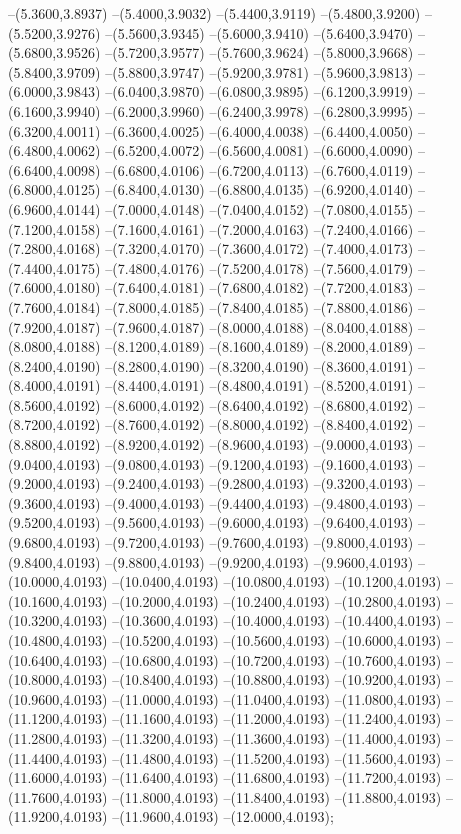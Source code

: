 {	--(5.3600,3.8937)
	--(5.4000,3.9032)
	--(5.4400,3.9119)
	--(5.4800,3.9200)
	--(5.5200,3.9276)
	--(5.5600,3.9345)
	--(5.6000,3.9410)
	--(5.6400,3.9470)
	--(5.6800,3.9526)
	--(5.7200,3.9577)
	--(5.7600,3.9624)
	--(5.8000,3.9668)
	--(5.8400,3.9709)
	--(5.8800,3.9747)
	--(5.9200,3.9781)
	--(5.9600,3.9813)
	--(6.0000,3.9843)
	--(6.0400,3.9870)
	--(6.0800,3.9895)
	--(6.1200,3.9919)
	--(6.1600,3.9940)
	--(6.2000,3.9960)
	--(6.2400,3.9978)
	--(6.2800,3.9995)
	--(6.3200,4.0011)
	--(6.3600,4.0025)
	--(6.4000,4.0038)
	--(6.4400,4.0050)
	--(6.4800,4.0062)
	--(6.5200,4.0072)
	--(6.5600,4.0081)
	--(6.6000,4.0090)
	--(6.6400,4.0098)
	--(6.6800,4.0106)
	--(6.7200,4.0113)
	--(6.7600,4.0119)
	--(6.8000,4.0125)
	--(6.8400,4.0130)
	--(6.8800,4.0135)
	--(6.9200,4.0140)
	--(6.9600,4.0144)
	--(7.0000,4.0148)
	--(7.0400,4.0152)
	--(7.0800,4.0155)
	--(7.1200,4.0158)
	--(7.1600,4.0161)
	--(7.2000,4.0163)
	--(7.2400,4.0166)
	--(7.2800,4.0168)
	--(7.3200,4.0170)
	--(7.3600,4.0172)
	--(7.4000,4.0173)
	--(7.4400,4.0175)
	--(7.4800,4.0176)
	--(7.5200,4.0178)
	--(7.5600,4.0179)
	--(7.6000,4.0180)
	--(7.6400,4.0181)
	--(7.6800,4.0182)
	--(7.7200,4.0183)
	--(7.7600,4.0184)
	--(7.8000,4.0185)
	--(7.8400,4.0185)
	--(7.8800,4.0186)
	--(7.9200,4.0187)
	--(7.9600,4.0187)
	--(8.0000,4.0188)
	--(8.0400,4.0188)
	--(8.0800,4.0188)
	--(8.1200,4.0189)
	--(8.1600,4.0189)
	--(8.2000,4.0189)
	--(8.2400,4.0190)
	--(8.2800,4.0190)
	--(8.3200,4.0190)
	--(8.3600,4.0191)
	--(8.4000,4.0191)
	--(8.4400,4.0191)
	--(8.4800,4.0191)
	--(8.5200,4.0191)
	--(8.5600,4.0192)
	--(8.6000,4.0192)
	--(8.6400,4.0192)
	--(8.6800,4.0192)
	--(8.7200,4.0192)
	--(8.7600,4.0192)
	--(8.8000,4.0192)
	--(8.8400,4.0192)
	--(8.8800,4.0192)
	--(8.9200,4.0192)
	--(8.9600,4.0193)
	--(9.0000,4.0193)
	--(9.0400,4.0193)
	--(9.0800,4.0193)
	--(9.1200,4.0193)
	--(9.1600,4.0193)
	--(9.2000,4.0193)
	--(9.2400,4.0193)
	--(9.2800,4.0193)
	--(9.3200,4.0193)
	--(9.3600,4.0193)
	--(9.4000,4.0193)
	--(9.4400,4.0193)
	--(9.4800,4.0193)
	--(9.5200,4.0193)
	--(9.5600,4.0193)
	--(9.6000,4.0193)
	--(9.6400,4.0193)
	--(9.6800,4.0193)
	--(9.7200,4.0193)
	--(9.7600,4.0193)
	--(9.8000,4.0193)
	--(9.8400,4.0193)
	--(9.8800,4.0193)
	--(9.9200,4.0193)
	--(9.9600,4.0193)
	--(10.0000,4.0193)
	--(10.0400,4.0193)
	--(10.0800,4.0193)
	--(10.1200,4.0193)
	--(10.1600,4.0193)
	--(10.2000,4.0193)
	--(10.2400,4.0193)
	--(10.2800,4.0193)
	--(10.3200,4.0193)
	--(10.3600,4.0193)
	--(10.4000,4.0193)
	--(10.4400,4.0193)
	--(10.4800,4.0193)
	--(10.5200,4.0193)
	--(10.5600,4.0193)
	--(10.6000,4.0193)
	--(10.6400,4.0193)
	--(10.6800,4.0193)
	--(10.7200,4.0193)
	--(10.7600,4.0193)
	--(10.8000,4.0193)
	--(10.8400,4.0193)
	--(10.8800,4.0193)
	--(10.9200,4.0193)
	--(10.9600,4.0193)
	--(11.0000,4.0193)
	--(11.0400,4.0193)
	--(11.0800,4.0193)
	--(11.1200,4.0193)
	--(11.1600,4.0193)
	--(11.2000,4.0193)
	--(11.2400,4.0193)
	--(11.2800,4.0193)
	--(11.3200,4.0193)
	--(11.3600,4.0193)
	--(11.4000,4.0193)
	--(11.4400,4.0193)
	--(11.4800,4.0193)
	--(11.5200,4.0193)
	--(11.5600,4.0193)
	--(11.6000,4.0193)
	--(11.6400,4.0193)
	--(11.6800,4.0193)
	--(11.7200,4.0193)
	--(11.7600,4.0193)
	--(11.8000,4.0193)
	--(11.8400,4.0193)
	--(11.8800,4.0193)
	--(11.9200,4.0193)
	--(11.9600,4.0193)
	--(12.0000,4.0193);
}
